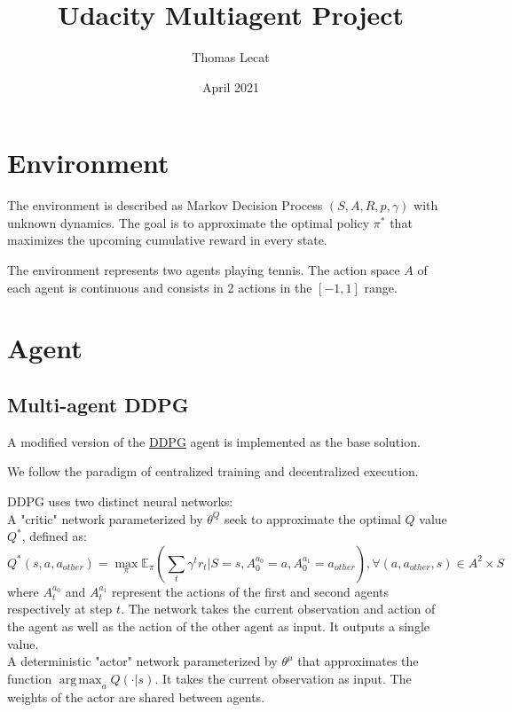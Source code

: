 \documentclass{article}
\title{Udacity Multiagent Project}
\author{Thomas Lecat}
\date{April 2021}
\DeclareMathOperator*{\argmax}{arg\,max}
\begin{document}
    \maketitle


    \section{Environment}\label{sec:environment}

    The environment is described as Markov Decision Process $(S, A, R, p, \gamma)$ with unknown dynamics.
    The goal is to approximate the optimal policy $\pi^*$ that maximizes the upcoming cumulative reward in every state.

    The environment represents two agents playing tennis.
    The action space $A$ of each agent is continuous and consists in 2 actions in the $[-1, 1]$ range.


    \section{Agent}\label{sec:agent}

    \subsection{Multi-agent DDPG}\label{subsec:ddpg}


    A modified version of the \href{https://arxiv.org/abs/1509.02971}{DDPG} agent is implemented as the base solution.

    We follow the paradigm of centralized training and decentralized execution.

    DDPG uses two distinct neural networks: \\

    A "critic" network parameterized by $\theta^Q$ seek to approximate the optimal $Q$ value $Q^*$, defined as:
    \[
        Q^*(s, a, a_{other}) = \max_{\pi} \mathbb{E}_{\pi} (\sum_{t} \gamma^t r_t | S=s, A^{a_0}_0=a, A^{a_1}_0=a_{other}),  \forall (a, a_{other}, s) \in A^2 \times S
    \]
    where $A^{a_0}_t$ and $A^{a_1}_t$ represent the actions of the first and second agents respectively at step $t$.
    The network takes the current observation and action of the agent as well as the action of the other agent as input. It outputs a single value.\\

    A deterministic "actor" network parameterized by $\theta^\mu$ that approximates the function $\argmax_a{Q(\cdot|s)}$.
    It takes the current observation as input.
    The weights of the actor are shared between agents.\\
\end{document}

